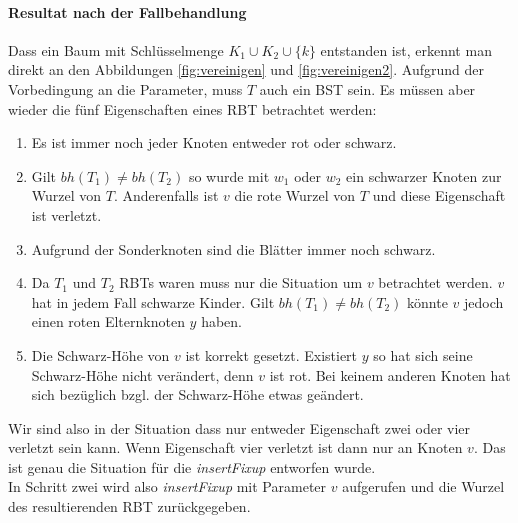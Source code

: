 \documentclass[a4paper,12pt]{article}
\begin{document}
\paragraph{Resultat nach der Fallbehandlung}
Dass ein Baum mit Schlüsselmenge  $K_1 \cup K_2 \cup \{k\} $ entstanden ist, erkennt man direkt an den Abbildungen \ref{fig:vereinigen} und \ref{fig:vereinigen2}. Aufgrund der Vorbedingung an die Parameter, muss $T$ auch ein BST sein. Es müssen aber wieder die fünf Eigenschaften eines RBT betrachtet werden:
\begin{enumerate}
	\item Es ist immer noch jeder Knoten entweder rot oder schwarz.
	\item Gilt $bh(T_1) \neq bh(T_2)$ so wurde mit $w_1$ oder $w_2$ ein schwarzer Knoten zur Wurzel von $T$. Anderenfalls ist $v$ die rote Wurzel von $T$ und diese Eigenschaft ist verletzt.   
	\item Aufgrund der Sonderknoten sind die Blätter immer noch schwarz.
	\item Da $T_1$ und $T_2$ RBTs waren muss nur die Situation um $v$ betrachtet werden. $v$ hat in jedem Fall schwarze Kinder. Gilt $bh(T_1) \neq bh(T_2)$ könnte $v$ jedoch einen roten Elternknoten $y$ haben. 
	\item Die Schwarz-Höhe von $v$ ist korrekt gesetzt. Existiert $y$ so hat sich seine Schwarz-Höhe nicht verändert, denn $v$ ist rot. Bei keinem anderen Knoten hat sich bezüglich bzgl. der Schwarz-Höhe etwas geändert. 
\end{enumerate} 
 Wir sind also in der Situation dass nur entweder Eigenschaft zwei oder vier verletzt sein kann. Wenn Eigenschaft vier verletzt ist dann nur an Knoten $v$. Das ist genau die Situation für die \textit{insertFixup} entworfen wurde.\\
 In Schritt zwei wird also \textit{insertFixup} mit Parameter $v$ aufgerufen und die Wurzel des resultierenden RBT zurückgegeben. 
\end{document}
